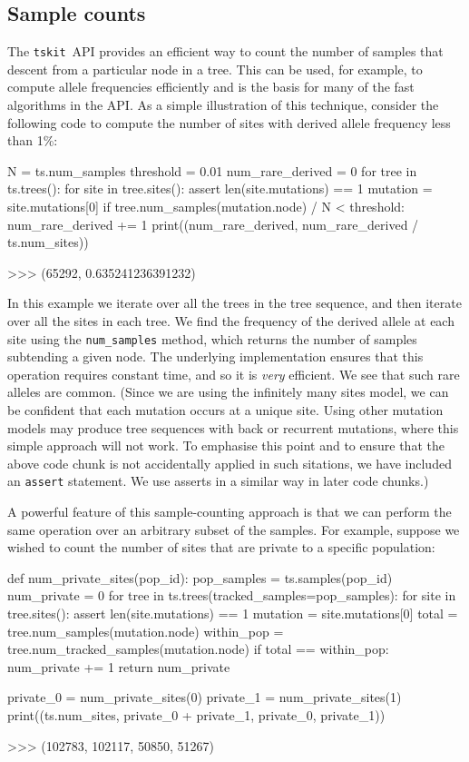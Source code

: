 \documentclass[graybox]{svmult}
\newcommand{\tskit}[0]{\texttt{tskit}}
\begin{document}
\subsection{Sample counts}\label{sample-counts}

The \tskit\ API provides an efficient way to count the number of samples that
descent from  a particular node in a tree. This can be used,
for example, to compute allele frequencies efficiently and is the basis
for many of the fast algorithms in the API. As a simple illustration of
this technique, consider the following code to compute the number of
sites with derived allele frequency less than 1\%:

\begin{pythoncode}
N = ts.num_samples
threshold = 0.01
num_rare_derived = 0
for tree in ts.trees():
    for site in tree.sites():
        assert len(site.mutations) == 1
        mutation = site.mutations[0]
        if tree.num_samples(mutation.node) / N < threshold:
            num_rare_derived += 1
print((num_rare_derived, num_rare_derived / ts.num_sites))

>>> (65292, 0.635241236391232)
\end{pythoncode}

In this example we iterate over all the trees in the tree sequence, and
then iterate over all the sites in each tree. We find the frequency
of the derived allele at each site using the \texttt{num\_samples}
method, which returns the number of samples subtending a given
node. The underlying implementation ensures that this operation requires
constant time, and so it is \emph{very} efficient. We see that such rare alleles are common.
(Since we are using the infinitely many sites model, we can be confident that
each mutation occurs at a unique site. Using other mutation models may produce
tree sequences with back or recurrent mutations, where this simple approach
will not work. To emphasise this point and to ensure that
the above code chunk is not accidentally applied in such sitations, we have included an
\texttt{assert} statement. We use asserts in a similar way in later code chunks.)

A powerful feature of this sample-counting approach is that we can
perform the same operation over an arbitrary subset of the samples. For
example, suppose we wished to count the number of sites that are private
to a specific population:

\begin{pythoncode}
def num_private_sites(pop_id):
    pop_samples = ts.samples(pop_id)
    num_private = 0
    for tree in ts.trees(tracked_samples=pop_samples):
        for site in tree.sites():
            assert len(site.mutations) == 1
            mutation = site.mutations[0]
            total = tree.num_samples(mutation.node)
            within_pop = tree.num_tracked_samples(mutation.node)
            if total == within_pop:
                num_private += 1
    return num_private

private_0 = num_private_sites(0)
private_1 = num_private_sites(1)
print((ts.num_sites, private_0 + private_1, private_0, private_1))

>>> (102783, 102117, 50850, 51267)
\end{pythoncode}
\end{document}
